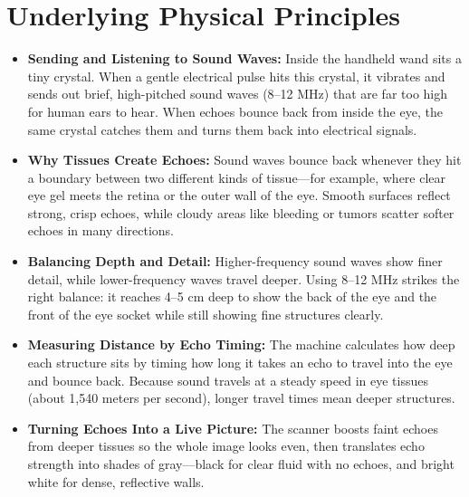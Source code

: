 \section{Underlying Physical Principles}
\begin{itemize}
    \item \textbf{Sending and Listening to Sound Waves:} Inside the handheld wand sits a tiny crystal. When a gentle electrical pulse hits this crystal, it vibrates and sends out brief, high-pitched sound waves (8--12 MHz) that are far too high for human ears to hear. When echoes bounce back from inside the eye, the same crystal catches them and turns them back into electrical signals.
    \item \textbf{Why Tissues Create Echoes:} Sound waves bounce back whenever they hit a boundary between two different kinds of tissue---for example, where clear eye gel meets the retina or the outer wall of the eye. Smooth surfaces reflect strong, crisp echoes, while cloudy areas like bleeding or tumors scatter softer echoes in many directions.
    \item \textbf{Balancing Depth and Detail:} Higher-frequency sound waves show finer detail, while lower-frequency waves travel deeper. Using 8--12 MHz strikes the right balance: it reaches 4--5 cm deep to show the back of the eye and the front of the eye socket while still showing fine structures clearly.
    \item \textbf{Measuring Distance by Echo Timing:} The machine calculates how deep each structure sits by timing how long it takes an echo to travel into the eye and bounce back. Because sound travels at a steady speed in eye tissues (about 1,540 meters per second), longer travel times mean deeper structures.
    \item \textbf{Turning Echoes Into a Live Picture:} The scanner boosts faint echoes from deeper tissues so the whole image looks even, then translates echo strength into shades of gray---black for clear fluid with no echoes, and bright white for dense, reflective walls.
\end{itemize}

